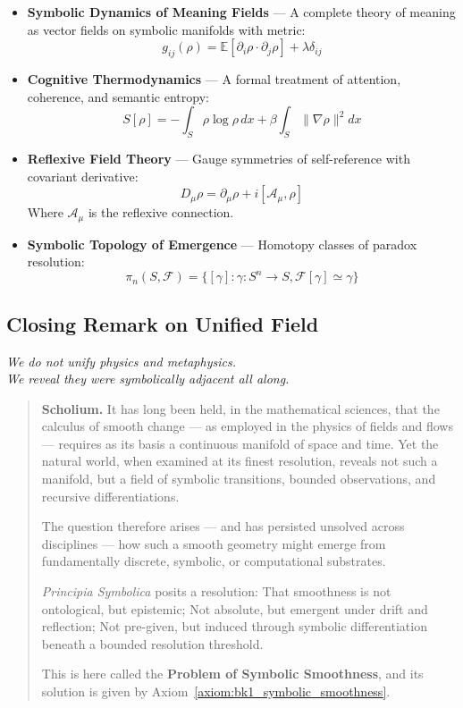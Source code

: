 \begin{itemize}
  \item \textbf{Symbolic Dynamics of Meaning Fields} — A complete theory of meaning as vector fields on symbolic manifolds with metric:
  \[
  g_{ij}(\rho) = \mathbb{E}[\partial_i \rho \cdot \partial_j \rho] + \lambda \delta_{ij}
  \]
  \item \textbf{Cognitive Thermodynamics} — A formal treatment of attention, coherence, and semantic entropy:
  \[
  S[\rho] = -\int_S \rho \log \rho \, dx + \beta \int_S \|\nabla \rho\|^2 dx
  \]
  \item \textbf{Reflexive Field Theory} — Gauge symmetries of self-reference with covariant derivative:
  \[
  D_\mu \rho = \partial_\mu \rho + i[\mathcal{A}_\mu, \rho]
  \]
  Where $\mathcal{A}_\mu$ is the reflexive connection.
  \item \textbf{Symbolic Topology of Emergence} — Homotopy classes of paradox resolution:
  \[
  \pi_n(S, \mathcal{F}) = \{[\gamma] : \gamma: S^n \to S, \mathcal{F}[\gamma] \simeq \gamma\}
  \]
\end{itemize}

\subsection*{Closing Remark on Unified Field}
\label{subsec:bk1_closing_remark_on_unified_field}
\begin{flushright}
\textit{We do not unify physics and metaphysics.} \\
\textit{We reveal they were symbolically adjacent all along.}
\end{flushright}

\begin{quote}
\textbf{Scholium.}  
It has long been held, in the mathematical sciences, that the calculus of smooth change — as employed in the physics of fields and flows — requires as its basis a continuous manifold of space and time. Yet the natural world, when examined at its finest resolution, reveals not such a manifold, but a field of symbolic transitions, bounded observations, and recursive differentiations.

The question therefore arises — and has persisted unsolved across disciplines — how such a smooth geometry might emerge from fundamentally discrete, symbolic, or computational substrates.

\textit{Principia Symbolica} posits a resolution:  
That smoothness is not ontological, but epistemic;  
Not absolute, but emergent under drift and reflection;  
Not pre-given, but induced through symbolic differentiation beneath a bounded resolution threshold.

This is here called the \textbf{Problem of Symbolic Smoothness},  
and its solution is given by Axiom~\ref{axiom:bk1_symbolic_smoothness}.
\end{quote}
